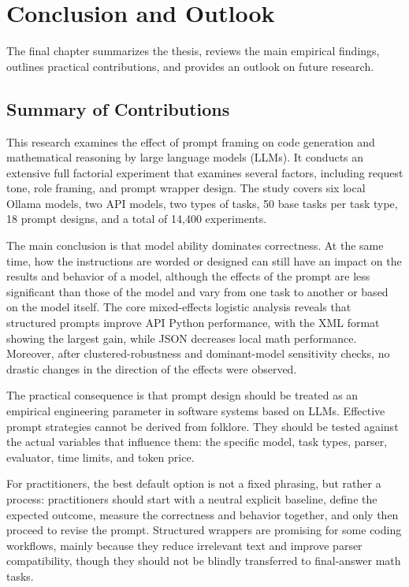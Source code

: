 \chapter{Conclusion and Outlook\label{cha:chapter7}}

The final chapter summarizes the thesis, reviews the main empirical findings, outlines practical contributions, and provides an outlook on future research.

\section{Summary of Contributions\label{sec:summary}}

This research examines the effect of prompt framing on code generation and mathematical reasoning by large language models (LLMs). It conducts an extensive full factorial experiment that examines several factors, including request tone, role framing, and prompt wrapper design. The study covers six local Ollama models, two API models, two types of tasks, 50 base tasks per task type, 18 prompt designs, and a total of 14,400 experiments.

The main conclusion is that model ability dominates correctness. At the same time, how the instructions are worded or designed can still have an impact on the results and behavior of a model, although the effects of the prompt are less significant than those of the model and vary from one task to another or based on the model itself. The core mixed-effects logistic analysis reveals that structured prompts improve API Python performance, with the XML format showing the largest gain, while JSON decreases local math performance. Moreover, after clustered-robustness and dominant-model sensitivity checks, no drastic changes in the direction of the effects were observed.

The practical consequence is that prompt design should be treated as an empirical engineering parameter in software systems based on LLMs. Effective prompt strategies cannot be derived from folklore. They should be tested against the actual variables that influence them: the specific model, task types, parser, evaluator, time limits, and token price.

For practitioners, the best default option is not a fixed phrasing, but rather a process: practitioners should start with a neutral explicit baseline, define the expected outcome, measure the correctness and behavior together, and only then proceed to revise the prompt. Structured wrappers are promising for some coding workflows, mainly because they reduce irrelevant text and improve parser compatibility, though they should not be blindly transferred to final-answer math tasks.

